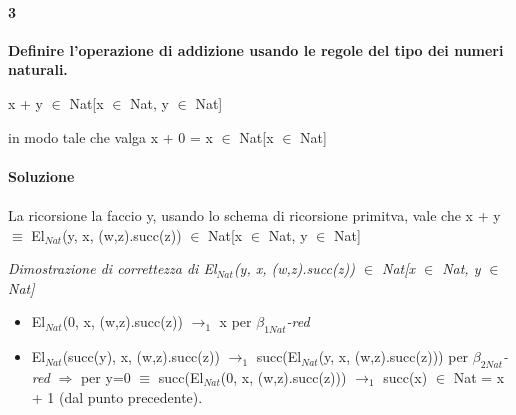 \paragraph{3}
\textbf{Definire l'operazione di addizione usando le regole del tipo dei numeri naturali.}
\begin{center} x + y $\in$ Nat[x $\in$ Nat, y $\in$ Nat]\end{center}
in modo tale che valga x + 0 = x $\in$  Nat[x $\in$ Nat]
\\\\
\textbf{Soluzione}\\\\
La ricorsione la faccio y, usando lo schema di ricorsione primitva, vale che x + y $\equiv$ El$_{Nat}$(y, x, (w,z).succ(z)) $\in$ Nat[x $\in$ Nat, y $\in$ Nat]


\scriptsize
\begin{adjustwidth}{-16em}{}
\begin{prooftree}
\end{prooftree}
\end{adjustwidth}
\noindent
\normalsize \textit{Dimostrazione di correttezza di El$_{Nat}$(y, x, (w,z).succ(z)) $\in$ Nat[x $\in$ Nat, y $\in$ Nat]}
\begin{itemize}
\item El$_{Nat}$(0, x, (w,z).succ(z))  $\rightarrow_1$ x per \textit{$\beta_{1Nat}$-red}
\item El$_{Nat}$(succ(y), x, (w,z).succ(z)) $\rightarrow_1$ succ(El$_{Nat}$(y, x, (w,z).succ(z))) per \textit{$\beta_{2Nat}$-red} $\Rightarrow$ per y=0 $\equiv$ succ(El$_{Nat}$(0, x, (w,z).succ(z))) $\rightarrow_1$ succ(x) $\in$ Nat = x + 1  (dal punto precedente).
\end{itemize}

